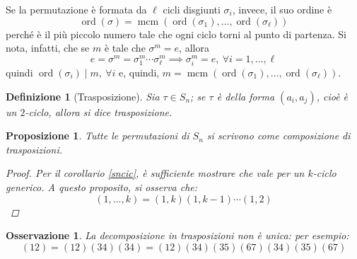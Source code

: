 \documentclass[12pt]{scrartcl}
\theoremstyle{style}
\newtheorem{definizione}{Definizione}[section]
\newtheorem{prop}{Proposizione}[section]
\newtheorem{osservazione}{Osservazione}[section]
\numberwithin{equation}{subsection}
\begin{document}
Se la permutazione \`e formata da $\ell $ cicli disgiunti $\sigma _i$, invece, il suo ordine \`e 
\[
\operatorname{ord}(\sigma ) = \operatorname{mcm} (\operatorname{ord}(\sigma_1) , \ldots, \operatorname{ord}(\sigma _\ell ) )
\] 
perch\'e \`e il pi\`u piccolo numero tale che ogni ciclo torni al punto di partenza.
Si nota, infatti, che se $m$ \`e tale che $\sigma ^m = e$, allora
\[
	e = \sigma  ^m  = \sigma_1 ^m \cdots \sigma _\ell ^m \implies \sigma _i^m = e , \ \forall i=1,\ldots,\ell 
\] 
quindi $\operatorname{ord}(\sigma _i)  \mid m, \ \forall i$ e, quindi, $m=\operatorname{mcm} (\operatorname{ord}(\sigma _1) ,\ldots,\operatorname{ord}(\sigma _\ell ) )$.
\begin{definizione}
	[Trasposizione]
	Sia $\tau \in S_n$; se $\tau $ \`e della forma $(a_i,a_j)$, cio\`e \`e un $2$-ciclo, allora si dice \textit{trasposizione}.
\end{definizione}
\begin{prop}
	Tutte le permutazioni di $S_n$ si scrivono come composizione di trasposizioni. 
	\begin{proof}
		Per il corollario \ref{sncic}, \`e sufficiente mostrare che vale per un $k$-ciclo generico. 
		A questo proposito, si osserva che:
		\[
			(1,\ldots,k)= (1,k) (1,k-1)\cdots (1,2)
		\] 
	\end{proof}
\end{prop}
\begin{osservazione}
La decomposizione in trasposizioni non \`e unica: per esempio:
\[
	(12) = (12)(34)(34) = (12)(34)(35)(67)(34)(35)(67)
\] 
\end{osservazione}
\end{document}
